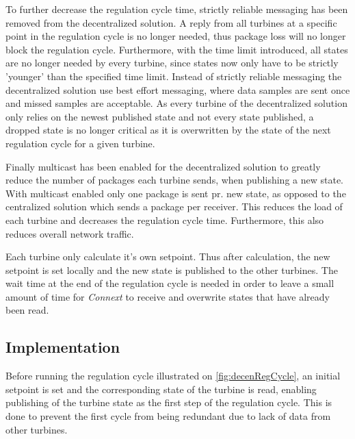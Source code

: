 To further decrease the regulation cycle time, strictly reliable messaging has been removed from the decentralized solution. A reply from all turbines at a specific point in the regulation cycle is no longer needed, thus package loss will no longer block the regulation cycle. Furthermore, with the time limit introduced, all states are no longer needed by every turbine, since states now only have to be strictly 'younger' than the specified time limit.
Instead of strictly reliable messaging the decentralized solution use best effort messaging, where data samples are sent once and missed samples are acceptable. As every turbine of the decentralized solution only relies on the newest published state and not every state published, a dropped state is no longer critical as it is overwritten by the state of the next regulation cycle for a given turbine.

Finally multicast has been enabled for the decentralized solution to greatly reduce the number of packages each turbine sends, when publishing a new state. With multicast enabled only one package is sent pr. new state, as opposed to the centralized solution which sends a package per receiver. This reduces the load of each turbine and decreases the regulation cycle time. Furthermore, this also reduces overall network traffic.  

Each turbine only calculate it's own setpoint. Thus after calculation, the new setpoint is set locally and the new state is published to the other turbines. The wait time at the end of the regulation cycle is needed in order to leave a small amount of time for \textit{Connext} to receive and overwrite states that have already been read.

\subsection{Implementation}

Before running the regulation cycle illustrated on \cref{fig:decenRegCycle}, an initial setpoint is set and the corresponding state of the turbine is read, enabling publishing of the turbine state as the first step of the regulation cycle. This is done to prevent the first cycle from being redundant due to lack of data from other turbines. 

